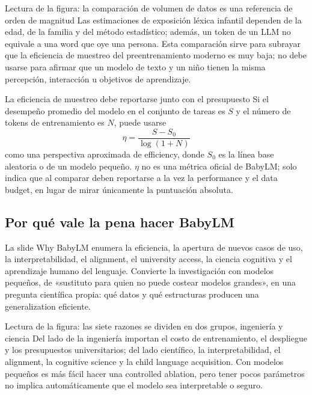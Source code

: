 
\begin{knowledgebox}{Lectura de la figura: la comparación de volumen de datos es una referencia de orden de magnitud}
Las estimaciones de exposición léxica infantil dependen de la edad, de la familia y del método estadístico; además, un token de un LLM no equivale a una word que oye una persona. Esta comparación sirve para subrayar que la eficiencia de muestreo del preentrenamiento moderno es muy baja; no debe usarse para afirmar que un modelo de texto y un niño tienen la misma percepción, interacción u objetivos de aprendizaje.
\end{knowledgebox}

\begin{importantbox}{La eficiencia de muestreo debe reportarse junto con el presupuesto}
Si el desempeño promedio del modelo en el conjunto de tareas es $S$ y el número de tokens de entrenamiento es $N$, puede usarse
\[
\eta=\frac{S-S_0}{\log(1+N)}
\]
como una perspectiva aproximada de efficiency, donde $S_0$ es la línea base aleatoria o de un modelo pequeño. $\eta$ no es una métrica oficial de BabyLM; solo indica que al comparar deben reportarse a la vez la performance y el data budget, en lugar de mirar únicamente la puntuación absoluta.
\end{importantbox}

\subsection{Por qué vale la pena hacer BabyLM}

La slide Why BabyLM enumera la eficiencia, la apertura de nuevos casos de uso, la interpretabilidad, el alignment, el university access, la ciencia cognitiva y el aprendizaje humano del lenguaje. Convierte la investigación con modelos pequeños, de «sustituto para quien no puede costear modelos grandes», en una pregunta científica propia: qué datos y qué estructuras producen una generalization eficiente.


\begin{knowledgebox}{Lectura de la figura: las siete razones se dividen en dos grupos, ingeniería y ciencia}
Del lado de la ingeniería importan el costo de entrenamiento, el despliegue y los presupuestos universitarios; del lado científico, la interpretabilidad, el alignment, la cognitive science y la child language acquisition. Con modelos pequeños es más fácil hacer una controlled ablation, pero tener pocos parámetros no implica automáticamente que el modelo sea interpretable o seguro.
\end{knowledgebox}


